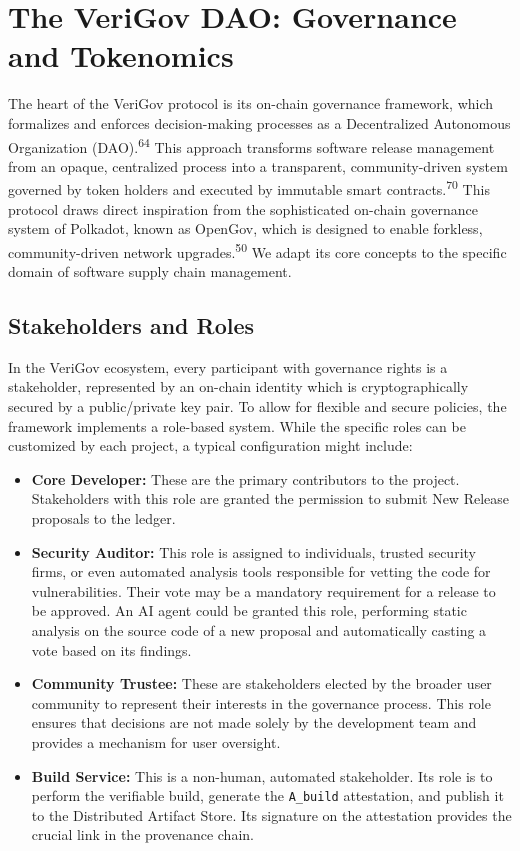 \documentclass{article}
\begin{document}
\section{The VeriGov DAO: Governance and Tokenomics}
\label{sec:the-verigov-dao-governance-and-tokenomics}

The heart of the VeriGov protocol is its on-chain governance framework, which formalizes and enforces decision-making processes as a Decentralized Autonomous Organization (DAO).\textsuperscript{64} This approach transforms software release management from an opaque, centralized process into a transparent, community-driven system governed by token holders and executed by immutable smart contracts.\textsuperscript{70} This protocol draws direct inspiration from the sophisticated on-chain governance system of Polkadot, known as OpenGov, which is designed to enable forkless, community-driven network upgrades.\textsuperscript{50} We adapt its core concepts to the specific domain of software supply chain management.

\subsection{Stakeholders and Roles}

In the VeriGov ecosystem, every participant with governance rights is a stakeholder, represented by an on-chain identity which is cryptographically secured by a public/private key pair. To allow for flexible and secure policies, the framework implements a role-based system. While the specific roles can be customized by each project, a typical configuration might include:

\begin{itemize}
\item \textbf{Core Developer:} These are the primary contributors to the project. Stakeholders with this role are granted the permission to submit New Release proposals to the ledger.
\item \textbf{Security Auditor:} This role is assigned to individuals, trusted security firms, or even automated analysis tools responsible for vetting the code for vulnerabilities. Their vote may be a mandatory requirement for a release to be approved. An AI agent could be granted this role, performing static analysis on the source code of a new proposal and automatically casting a vote based on its findings.
\item \textbf{Community Trustee:} These are stakeholders elected by the broader user community to represent their interests in the governance process. This role ensures that decisions are not made solely by the development team and provides a mechanism for user oversight.
\item \textbf{Build Service:} This is a non-human, automated stakeholder. Its role is to perform the verifiable build, generate the \lstinline{A_build} attestation, and publish it to the Distributed Artifact Store. Its signature on the attestation provides the crucial link in the provenance chain.
\end{itemize}
\end{document}
